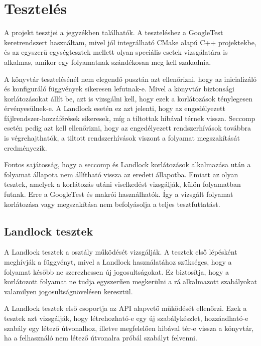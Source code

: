 \chapter{Tesztelés}

A projekt tesztjei a  jegyzékben találhatók. A teszteléshez a
GoogleTest keretrendszert használtam, mivel jól integrálható CMake alapú C++
projektekbe, és az egyszerű egységtesztek mellett olyan speciális esetek
vizsgálatára is alkalmas, amikor egy folyamatnak szándékosan meg kell
szakadnia.

A könyvtár tesztelésénél nem elegendő pusztán azt ellenőrizni, hogy az
inicializáló és konfiguráló függvények sikeresen lefutnak-e. Mivel a könyvtár
biztonsági korlátozásokat állít be, azt is vizsgálni kell, hogy ezek a
korlátozások ténylegesen érvényesülnek-e. A Landlock esetén ez azt jelenti,
hogy az engedélyezett fájlrendszer-hozzáférések sikeresek, míg a tiltottak
hibával térnek vissza. Seccomp esetén pedig azt kell ellenőrizni, hogy az
engedélyezett rendszerhívások továbbra is végrehajthatók, a tiltott
rendszerhívások viszont a folyamat megszakítását eredményezik.

Fontos sajátosság, hogy a seccomp és Landlock korlátozások alkalmazása után a
folyamat állapota nem állítható vissza az eredeti állapotba. Emiatt az olyan
tesztek, amelyek a korlátozás utáni viselkedést vizsgálják, külön folyamatban
futnak. Erre a GoogleTest  és
 makrói használhatók. Így a vizsgált folyamat
korlátozása vagy megszakítása nem befolyásolja a teljes tesztfuttatást.

\section{Landlock tesztek}

A Landlock tesztek a  osztály működését vizsgálják. A
tesztek első lépésként meghívják a
 függvényt, mivel a
Landlock használatához szükséges, hogy a folyamat később ne szerezhessen új
jogosultságokat. Ez biztosítja, hogy a korlátozott folyamat ne tudja egyszerűen
megkerülni a rá alkalmazott szabályokat valamilyen jogosultságnövelésen
keresztül.

A Landlock tesztek első csoportja az API alapvető működését ellenőrzi. Ezek a
tesztek azt vizsgálják, hogy létrehozható-e egy új szabálykészlet, hozzáadható-e
szabály egy létező útvonalhoz, illetve megfelelően hibával tér-e vissza a
könyvtár, ha a felhasználó nem létező útvonalra próbál szabályt felvenni.

